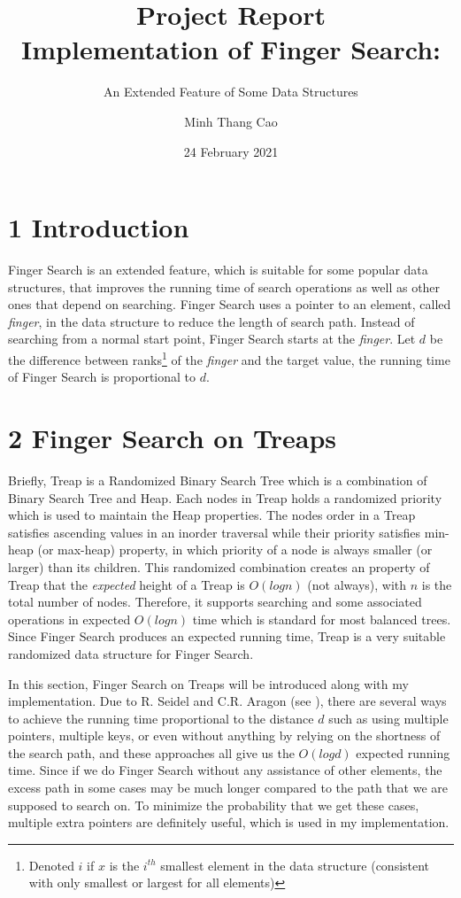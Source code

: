 \documentclass[12pt,english,]{article}
\title{\textbf{Project Report}\\
\Large{Implementation of Finger Search:}}
\subtitle{An Extended Feature of Some Data Structures}
\author{Minh Thang Cao}
\date{24 February 2021}
\begin{document}
\maketitle

\graphicspath{ {./} }

\hypertarget{section1}{%
\section{\texorpdfstring{1
\enspace Introduction}{1 Introduction}}\label{section1}}

Finger Search is an extended feature, which is suitable for some popular
data structures, that improves the running time of search operations as
well as other ones that depend on searching. Finger Search uses a
pointer to an element, called \emph{finger}, in the data structure to
reduce the length of search path. Instead of searching from a normal
start point, Finger Search starts at the \emph{finger}. Let \(d\) be the
difference between ranks\footnote{Denoted \(i\) if \(x\) is the
  \(i^{th}\) smallest element in the data structure (consistent with
  only smallest or largest for all elements)} of the \emph{finger} and
the target value, the running time of Finger Search is proportional to
\(d\).

\hypertarget{section2}{%
\section{\texorpdfstring{2 \enspace Finger Search on
Treaps}{2 Finger Search on Treaps}}\label{section2}}

Briefly, Treap is a Randomized Binary Search Tree which is a combination
of Binary Search Tree and Heap. Each nodes in Treap holds a randomized
priority which is used to maintain the Heap properties. The nodes order
in a Treap satisfies ascending values in an inorder traversal while
their priority satisfies min-heap (or max-heap) property, in which
priority of a node is always smaller (or larger) than its children. This
randomized combination creates an property of Treap that the
\emph{expected} height of a Treap is \(O(logn)\) (not always), with
\(n\) is the total number of nodes. Therefore, it supports searching and
some associated operations in expected \(O(logn)\) time which is
standard for most balanced trees. Since Finger Search produces an
expected running time, Treap is a very suitable randomized data
structure for Finger Search.

In this section, Finger Search on Treaps will be introduced along with
my implementation. Due to R. Seidel and C.R. Aragon (see \cite{1}),
there are several ways to achieve the running time proportional to the
distance \(d\) such as using multiple pointers, multiple keys, or even
without anything by relying on the shortness of the search path, and
these approaches all give us the \(O(logd)\) expected running time.
Since if we do Finger Search without any assistance of other elements,
the excess path in some cases may be much longer compared to the path
that we are supposed to search on. To minimize the probability that we
get these cases, multiple extra pointers are definitely useful, which is
used in my implementation.
\end{document}
